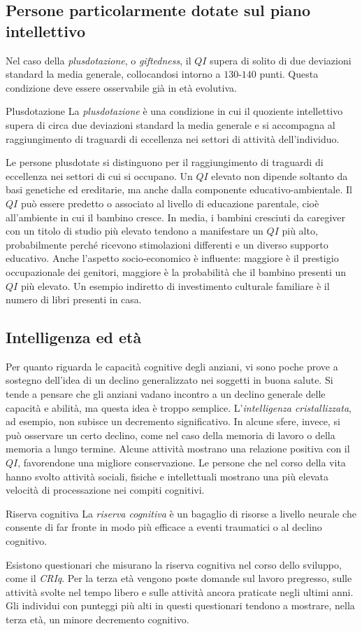 \documentclass[a4paper]{article}
\begin{document}
\subsection{Persone particolarmente dotate sul piano intellettivo}
Nel caso della \emph{plusdotazione}, o \emph{giftedness}, il \(QI\) supera di solito di due deviazioni standard la media generale, collocandosi intorno a \(130\)-\(140\) punti. Questa condizione deve essere osservabile già in età evolutiva.
\begin{snippetdefinition}{Plusdotazione}
    La \emph{plusdotazione} è una condizione in cui il quoziente intellettivo supera di circa due deviazioni standard la media generale e si accompagna al raggiungimento di traguardi di eccellenza nei settori di attività dell'individuo.
\end{snippetdefinition}
Le persone plusdotate si distinguono per il raggiungimento di traguardi di eccellenza nei settori di cui si occupano.
Un \(QI\) elevato non dipende soltanto da basi genetiche ed ereditarie, ma anche dalla componente educativo-ambientale.
Il \(QI\) può essere predetto o associato al livello di educazione parentale, cioè all'ambiente in cui il bambino cresce. In media, i bambini cresciuti da caregiver con un titolo di studio più elevato tendono a manifestare un \(QI\) più alto, probabilmente perché ricevono stimolazioni differenti e un diverso supporto educativo.
Anche l'aspetto socio-economico è influente: maggiore è il prestigio occupazionale dei genitori, maggiore è la probabilità che il bambino presenti un \(QI\) più elevato. Un esempio indiretto di investimento culturale familiare è il numero di libri presenti in casa.
\subsection{Intelligenza ed età}
Per quanto riguarda le capacità cognitive degli anziani, vi sono poche prove a sostegno dell'idea di un declino generalizzato nei soggetti in buona salute.
Si tende a pensare che gli anziani vadano incontro a un declino generale delle capacità e abilità, ma questa idea è troppo semplice. L'\emph{intelligenza cristallizzata}, ad esempio, non subisce un decremento significativo. In alcune sfere, invece, si può osservare un certo declino, come nel caso della memoria di lavoro o della memoria a lungo termine.
Alcune attività mostrano una relazione positiva con il \(QI\), favorendone una migliore conservazione. Le persone che nel corso della vita hanno svolto attività sociali, fisiche e intellettuali mostrano una più elevata velocità di processazione nei compiti cognitivi.
\begin{snippetdefinition}{Riserva cognitiva}
    La \emph{riserva cognitiva} è un bagaglio di risorse a livello neurale che consente di far fronte in modo più efficace a eventi traumatici o al declino cognitivo.
\end{snippetdefinition}
Esistono questionari che misurano la riserva cognitiva nel corso dello sviluppo, come il \emph{CRIq}. Per la terza età vengono poste domande sul lavoro pregresso, sulle attività svolte nel tempo libero e sulle attività ancora praticate negli ultimi anni.
Gli individui con punteggi più alti in questi questionari tendono a mostrare, nella terza età, un minore decremento cognitivo.
\end{document}
